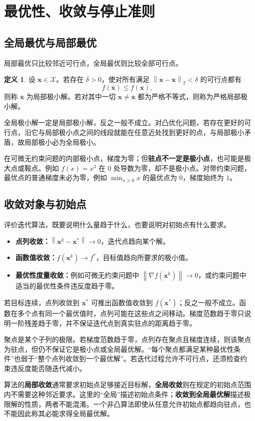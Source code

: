 \documentclass[UTF8,fontset=fandol,a4paper,12pt]{ctexart}
\newcommand{\vx}{\boldsymbol x}
\newcommand{\norm}[1]{\left\lVert#1\right\rVert}
\theoremstyle{definition}
\newtheorem{definition}{定义}[section]
\begin{document}
\section{最优性、收敛与停止准则}
\subsection{全局最优与局部最优}
局部最优只比较邻近可行点，全局最优则比较全部可行点。
\begin{definition}
设 $\overline{\vx}\in\mathcal X$。若存在 $\delta>0$，使对所有满足 $\norm{\vx-\overline{\vx}}_2<\delta$ 的可行点都有
\[
 f(\overline{\vx})\le f(\vx),
\]
则称 $\overline{\vx}$ 为局部极小解。若对其中一切 $\vx\ne\overline{\vx}$ 都为严格不等式，则称为严格局部极小解。
\end{definition}
全局极小解一定是局部极小解，反之一般不成立。对凸优化问题，若存在更好的可行点，沿它与局部极小点之间的线段就能在任意近处找到更好的点，与局部极小矛盾，故局部极小必为全局极小。

在可微无约束问题的内部极小点，梯度为零；但\textbf{驻点不一定是极小点}，也可能是极大点或鞍点。例如 $f(x)=x^3$ 在 $0$ 处导数为零，却不是极小点。对带约束问题，最优点的普通梯度未必为零，例如 $\min_{x\ge0}x$ 的最优点为 $0$，梯度始终为 $1$。

\subsection{收敛对象与初始点}
评价迭代算法，既要说明什么量趋于什么，也要说明对初始点有什么要求。
\begin{itemize}
\item \textbf{点列收敛：}$\norm{\vx^k-\vx^*}\to0$，迭代点趋向某个解。
\item \textbf{函数值收敛：}$f(\vx^k)\to f^*$，目标值趋向所要求的极小值。
\item \textbf{最优性度量收敛：}例如可微无约束问题中 $\norm{\nabla f(\vx^k)}\to0$，或约束问题中适当的最优性条件违反度趋于零。
\end{itemize}
若目标连续，点列收敛到 $\vx^*$ 可推出函数值收敛到 $f(\vx^*)$；反之一般不成立。函数在多个点有同一个最优值时，点列可能在这些点之间移动。梯度范数趋于零只说明一阶残差趋于零，并不保证迭代点到真实驻点的距离趋于零。

聚点是某个子列的极限。若梯度范数趋于零，点列存在聚点且梯度连续，则该聚点为驻点，但仍不保证它是极小点或全局最优解。“每个聚点都满足某种最优性条件”也弱于“整个点列收敛到一个最优解”。若迭代过程允许不可行点，还须检查约束违反度能否随迭代减小。

算法的\textbf{局部收敛}通常要求初始点足够接近目标解，\textbf{全局收敛}则在规定的初始点范围内不需要这种邻近要求。这里的“全局”描述初始点条件；\textbf{收敛到全局最优解}描述极限解的性质，两者不能混淆。一个非凸算法即使从任意允许初始点都趋向驻点，也不能因此称其必能求得全局最优解。
\end{document}
